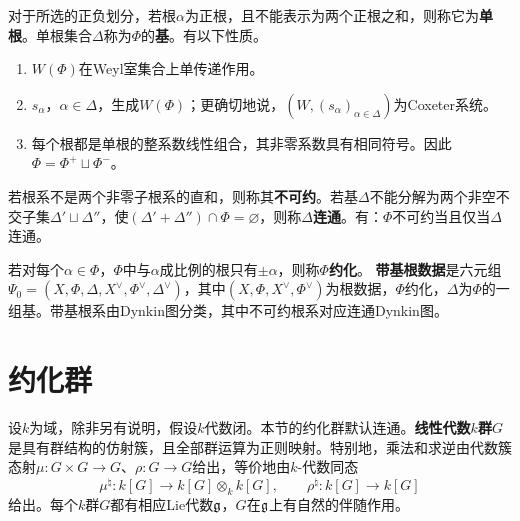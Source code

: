 对于所选的正负划分，若根$\alpha$为正根，且不能表示为两个正根之和，则称它为\textbf{单根}。单根集合$\Delta$称为$\Phi$的\textbf{基}。有以下性质。
\begin{enumerate}[label=\arabic*.]
\item $W(\Phi)$在Weyl室集合上单传递作用。
\item $s_\alpha$，$\alpha\in\Delta$，生成$W(\Phi)$；更确切地说，$(W,(s_\alpha)_{\alpha\in\Delta})$为Coxeter系统。
\item 每个根都是单根的整系数线性组合，其非零系数具有相同符号。因此$\Phi=\Phi^+\sqcup\Phi^-$。
\end{enumerate}
若根系不是两个非零子根系的直和，则称其\textbf{不可约}。若基$\Delta$不能分解为两个非空不交子集$\Delta'\sqcup\Delta''$，使$(\Delta'+\Delta'')\cap\Phi=\varnothing$，则称$\Delta$\textbf{连通}。有：$\Phi$不可约当且仅当$\Delta$连通。

若对每个$\alpha\in\Phi$，$\Phi$中与$\alpha$成比例的根只有$\pm\alpha$，则称$\Phi$\textbf{约化}。
\textbf{带基根数据}是六元组$\Psi_0=(X,\Phi,\Delta,X^\vee,\Phi^\vee,\Delta^\vee)$，其中$(X,\Phi,X^\vee,\Phi^\vee)$为根数据，$\Phi$约化，$\Delta$为$\Phi$的一组基。带基根系由Dynkin图分类，其中不可约根系对应连通Dynkin图。
\section{约化群}\label{L18S2}
设$k$为域，除非另有说明，假设$k$代数闭。本节的约化群默认连通。\textbf{线性代数$k$群}$G$是具有群结构的仿射簇，且全部群运算为正则映射。特别地，乘法和求逆由代数簇态射$\mu:G\times G\to G$、$\rho:G\to G$给出，等价地由$k$-代数同态
\[\mu^\natural:k[G]\to k[G]\otimes_k k[G],\qquad\rho^\natural:k[G]\to k[G]\]
给出。每个$k$群$G$都有相应Lie代数$\mathfrak{g}$，$G$在$\mathfrak{g}$上有自然的伴随作用。

